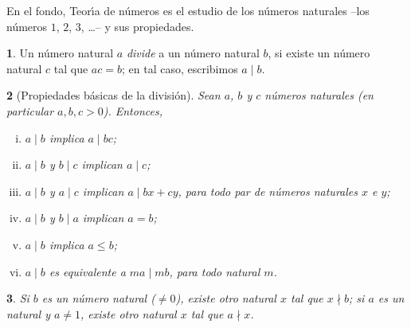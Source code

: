 \theoremstyle{plain}
\newtheorem{teoDivisibilidad}{\teoname}[section]
\newtheorem{coroDivisibilidad}[teoDivisibilidad]{\coroname}

\theoremstyle{definition}
\newtheorem{defDivisibilidad}[teoDivisibilidad]{}
\newtheorem{obsDivisibilidad}[teoDivisibilidad]{\obsname}
\newtheorem{ejemDivisibilidad}[teoDivisibilidad]{\ejemname}


En el fondo, Teor\'{\i}a de n\'umeros es el estudio de los n\'umeros naturales
--los n\'umeros $1$, $2$, $3$, \dots-- y sus propiedades.

\begin{defDivisibilidad}\label{def:divisibilidad}
	Un n\'umero natural $a$ \emph{divide} a un n\'umero natural $b$, si
	existe un n\'umero natural $c$ tal que $ac=b$; en tal caso,
	escribimos $a\mid b$.
\end{defDivisibilidad}

\begin{teoDivisibilidad}[Propiedades b\'asicas de la divisi\'on]%
	\label{teo:divisibilidad:propiedades}
	Sean $a$, $b$ y $c$ n\'umeros naturales
	(en particular $a,b,c>0$). Entonces,
	\begin{enumerate}[(i)]
		\item\label{item:teo:divisibilidad:propiedades:i}
			$a\mid b$ implica $a\mid bc$;
		\item\label{item:teo:divisibilidad:propiedades:ii}
			$a\mid b$ y $b\mid c$ implican $a\mid c$;
		\item\label{item:teo:divisibilidad:propiedades:iii}
			$a\mid b$ y $a\mid c$ implican $a\mid bx+cy$,
			para todo par de n\'umeros naturales $x$ e $y$;
		\item\label{item:teo:divisibilidad:propiedades:iv}
			$a\mid b$ y $b\mid a$ implican $a=b$;
		\item\label{item:teo:divisibilidad:propiedades:v}
			$a\mid b$ implica $a\leq b$;
		\item\label{item:teo:divisibilidad:propiedades:vi}
			$a\mid b$ es equivalente a $ma\mid mb$,
			para todo natural $m$.
	\end{enumerate}
\end{teoDivisibilidad}

\begin{coroDivisibilidad}\label{coro:divisibilidad:propiedades}
	Si $b$ es un n\'umero natural ($\neq 0$), existe otro natural $x$ tal
	que $x\nmid b$; si $a$ es un natural y $a\neq 1$, existe otro natural
	$x$ tal que $a\nmid x$.
\end{coroDivisibilidad}

